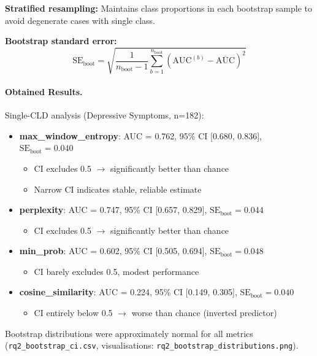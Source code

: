 \textbf{Stratified resampling:} Maintains class proportions in each bootstrap sample to avoid degenerate cases with single class.

\textbf{Bootstrap standard error:}
\[
\text{SE}_{\text{boot}} = \sqrt{\frac{1}{n_{\text{boot}}-1}\sum_{b=1}^{n_{\text{boot}}}\left(\text{AUC}^{(b)} - \overline{\text{AUC}}\right)^2}
\]

\paragraph{Obtained Results.} Single-CLD analysis (Depressive Symptoms, n=182):
\begin{itemize}
    \item \textbf{max\_window\_entropy}: AUC = 0.762, 95\% CI [0.680, 0.836], \(\text{SE}_{\text{boot}} = 0.040\)
    \begin{itemize}
        \item CI excludes 0.5 \(\rightarrow\) significantly better than chance
        \item Narrow CI indicates stable, reliable estimate
    \end{itemize}
    \item \textbf{perplexity}: AUC = 0.747, 95\% CI [0.657, 0.829], \(\text{SE}_{\text{boot}} = 0.044\)
    \begin{itemize}
        \item CI excludes 0.5 \(\rightarrow\) significantly better than chance
    \end{itemize}
    \item \textbf{min\_prob}: AUC = 0.602, 95\% CI [0.505, 0.694], \(\text{SE}_{\text{boot}} = 0.048\)
    \begin{itemize}
        \item CI barely excludes 0.5, modest performance
    \end{itemize}
    \item \textbf{cosine\_similarity}: AUC = 0.224, 95\% CI [0.149, 0.305], \(\text{SE}_{\text{boot}} = 0.040\)
    \begin{itemize}
        \item CI entirely below 0.5 \(\rightarrow\) worse than chance (inverted predictor)
    \end{itemize}
\end{itemize}

Bootstrap distributions were approximately normal for all metrics (\texttt{rq2\_bootstrap\_ci.csv}, visualisations: \texttt{rq2\_bootstrap\_distributions.png}).

